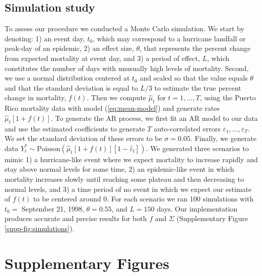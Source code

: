 \documentclass[11pt]{article}
\begin{document}
\subsection{Simulation study}
\label{subsec:simulations}
To assess our procedure we conducted a Monte Carlo simulation. We start by denoting: 1) an event day, $t_0$, which may correspond to a hurricane landfall or peak-day of an epidemic, 2) an effect size, $\theta$, that represents the percent change from expected mortality at event day, and 3) a period of effect, $L$, which constitutes the number of days with unusually high levels of mortality. Second, we use a normal distribution centered at $t_0$ and scaled so that the value equals $\theta$ and that the standard deviation is equal to $L/3$ to estimate the true percent change in mortality, $f(t)$. Then we compute $\hat{\mu}_t$ for $t=1,\ldots, T$, using the Puerto Rico mortality data with model (\ref{eq:mean-model}) and generate rates $\hat{\mu}_t\left[1+f(t)\right]$. To generate the AR process, we first fit an AR model to our data and use the estimated coefficients to generate $T$ auto-correlated errors $\varepsilon_1, \dots, \varepsilon_T$. We set the standard deviation of these errors to be $\sigma = 0.05$.  Finally, we generate data $Y_t^* \sim \mbox{Poisson}\left(\hat{\mu}_t[1+f(t)][1 - \hat{\varepsilon}_t]\right)$. We generated three scenarios to mimic 1) a hurricane-like event where we expect mortality to increase rapidly and stay above normal levels for some time, 2) an epidemic-like event in which mortality increases slowly until reaching some plateau and then decreasing to normal levels, and 3) a time period of no event in which we expect our estimate of $f(t)$ to be centered around 0. For each scenario we ran 100 simulations with $t_0 = $ September 21, 1998, $\theta = 0.55$, and $L=150$ days. Our implementation produces accurate and precise results for both $f$ and $\Sigma$ (Supplementary Figure \ref{supp-fig:simulations}).

\newpage

\section{Supplementary Figures}
\end{document}
